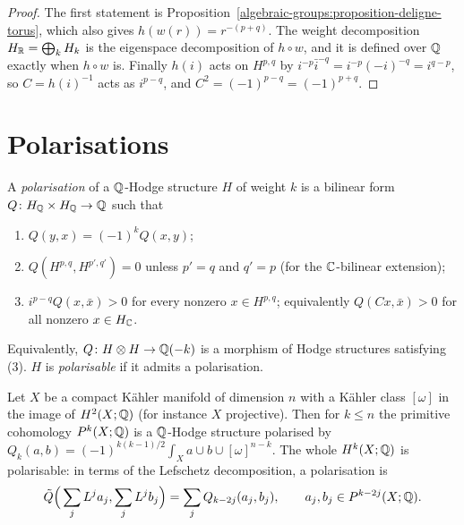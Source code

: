 \begin{proof}
The first statement is Proposition~\ref{algebraic-groups:proposition-deligne-torus}, which also gives $h(w(r)) = r^{-(p+q)}$. The weight decomposition $H_{\mathbb{R}} = \bigoplus_kH_k$ is the eigenspace
decomposition of $h \circ w$, and it is defined over $\mathbb{Q}$ exactly when $h \circ w$ is. Finally $h(i)$ acts on $H^{p,q}$ by $i^{-p}\bar i^{-q} = i^{-p}(-i)^{-q} = i^{q-p}$, so
$C = h(i)^{-1}$ acts as $i^{p-q}$, and $C^2 = (-1)^{p-q} = (-1)^{p+q}$.
\end{proof}

\section{Polarisations}\label{hodge-structures:section-polarisations}

\begin{definition}\label{hodge-structures:definition-polarisation}
A \emph{polarisation} of a $\mathbb{Q}$-Hodge structure $H$ of weight $k$ is a bilinear form $Q \colon H_{\mathbb{Q}} \times H_{\mathbb{Q}} \to \mathbb{Q}$ such that
\begin{enumerate}
\item $Q(y, x) = (-1)^kQ(x, y)$;
\item $Q(H^{p,q}, H^{p',q'}) = 0$ unless $p' = q$ and $q' = p$ (for the $\mathbb{C}$-bilinear extension);
\item $i^{p-q}Q(x, \bar x) > 0$ for every nonzero $x \in H^{p,q}$; equivalently $Q(Cx, \bar x) > 0$ for all nonzero $x \in H_{\mathbb{C}}$.
\end{enumerate}
Equivalently, $Q \colon H \otimes H \to \mathbb{Q}(-k)$ is a morphism of Hodge structures satisfying (3). $H$ is \emph{polarisable} if it admits a polarisation.
\end{definition}

\begin{theorem}\label{hodge-structures:theorem-cohomology-polarised}
Let $X$ be a compact K\"ahler manifold of dimension $n$ with a K\"ahler class $[\omega]$ in the image of $H^2(X; \mathbb{Q})$ (for instance $X$ projective). Then for $k \leq n$ the primitive
cohomology $P^k(X; \mathbb{Q})$ is a $\mathbb{Q}$-Hodge structure polarised by $Q_k(a, b) = (-1)^{k(k-1)/2}\int_Xa \cup b \cup [\omega]^{n-k}$. The whole $H^k(X; \mathbb{Q})$ is polarisable: in terms
of the Lefschetz decomposition, a polarisation is
\[
\tilde Q\Big(\sum_jL^ja_j, \sum_jL^jb_j\Big) = \sum_jQ_{k-2j}(a_j, b_j), \qquad a_j, b_j \in P^{k-2j}(X; \mathbb{Q}).
\]
\end{theorem}

